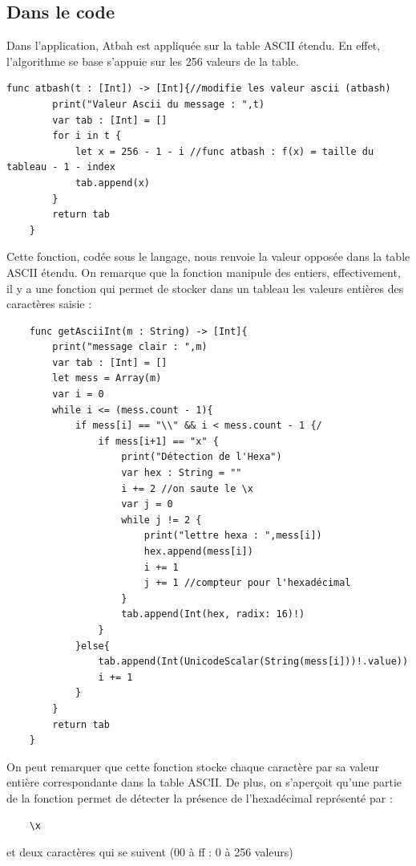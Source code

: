 \documentclass{article}
\begin{document}
\subsection{Dans le code}
Dans l'application, Atbah est appliquée sur la table ASCII étendu.\newline
En effet, l'algorithme se base s'appuie sur les 256 valeurs de la table.
\begin{verbatim}
func atbash(t : [Int]) -> [Int]{//modifie les valeur ascii (atbash)
        print("Valeur Ascii du message : ",t)
        var tab : [Int] = []
        for i in t {
            let x = 256 - 1 - i //func atbash : f(x) = taille du tableau - 1 - index
            tab.append(x)
        }
        return tab
    }
\end{verbatim}
Cette fonction, codée sous le langage, nous renvoie la valeur opposée dans la table ASCII étendu. On remarque que la fonction manipule des entiers, effectivement, il y a une fonction qui permet de stocker dans un tableau les valeurs entières des caractères saisie : 
\begin{verbatim}
    func getAsciiInt(m : String) -> [Int]{
        print("message clair : ",m)
        var tab : [Int] = []
        let mess = Array(m)
        var i = 0
        while i <= (mess.count - 1){
            if mess[i] == "\\" && i < mess.count - 1 {/
                if mess[i+1] == "x" {
                    print("Détection de l'Hexa")
                    var hex : String = ""
                    i += 2 //on saute le \x
                    var j = 0
                    while j != 2 {
                        print("lettre hexa : ",mess[i])
                        hex.append(mess[i])
                        i += 1
                        j += 1 //compteur pour l'hexadécimal
                    }
                    tab.append(Int(hex, radix: 16)!)
                }
            }else{
                tab.append(Int(UnicodeScalar(String(mess[i]))!.value))
                i += 1
            }
        }
        return tab
    }
\end{verbatim}
On peut remarquer que cette fonction stocke chaque caractère par sa valeur entière correspondante dans la table ASCII. De plus, on s'aperçoit qu'une partie de la fonction permet de détecter la présence de l'hexadécimal représenté par :

\begin{verbatim}
    \x
\end{verbatim} et deux caractères qui se suivent (00 à ff : 0 à 256 valeurs)
\end{document}
